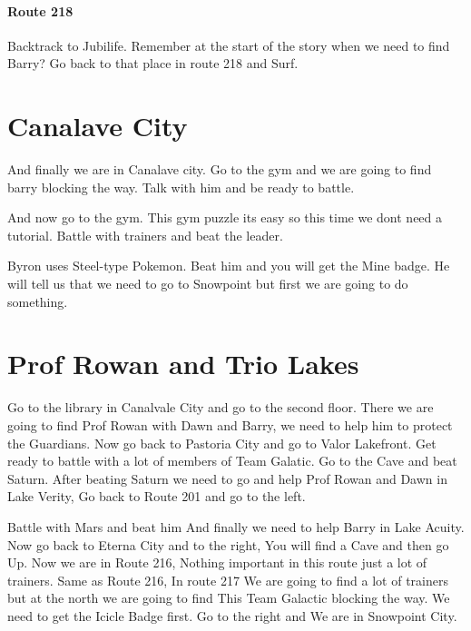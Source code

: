 \documentclass[11pt]{article}
\begin{document}
\paragraph{Route 218}

Backtrack to Jubilife.
Remember at the start of the story when we need to find Barry?
Go back to that place in route 218 and Surf.



\section{Canalave City}\label{sec:canalave-city}

And finally we are in Canalave city.
Go to the gym and we are going to find barry blocking the way.
Talk with him and be ready to battle.

And now go to the gym.
This gym puzzle its easy so this time we dont need a tutorial.
Battle with trainers and beat the leader.

Byron uses Steel-type Pokemon.
Beat him and you will get the Mine badge.
He will tell us that we need to go to Snowpoint but first we are going to do something.

\section{Prof Rowan and Trio Lakes}\label{sec:prof-rowan-and-trio-lakes}
Go to the library in Canalvale City and go to the second floor.
There we are going to find Prof Rowan with Dawn and Barry,
we need to help him to protect the Guardians.
Now go back to Pastoria City and go to Valor Lakefront.
Get ready to battle with a lot of members of Team Galatic.
Go to the Cave and beat Saturn.
After beating Saturn we need to go and help Prof Rowan and Dawn in Lake Verity, Go back to Route 201 and go to the left.

Battle with Mars and beat him
And finally we need to help Barry in Lake Acuity.
Now go back to Eterna City and to the right, You will find a Cave and then go Up.
Now we are in Route 216, Nothing important in this route just a lot of trainers.
Same as Route 216, In route 217 We are going to find a lot of trainers
but at the north we are going to find This Team Galactic blocking the way.
We need to get the Icicle Badge first.
Go to the right and We are in Snowpoint City.
\end{document}
